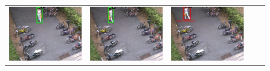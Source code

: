 \begin{figure}[t]
\begin{tabular}{ccccc}
    \includegraphics[scale=0.24]{figures/case-3-suspicious-0197} &
    \includegraphics[scale=0.24]{figures/case-3-suspicious-0233} &
    \includegraphics[scale=0.24]{figures/case-3-suspicious-0246} &

\end{tabular}
\end{figure}
